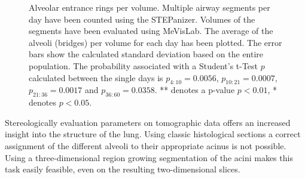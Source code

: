 \begin{figure}
	\centering
	\caption[Alveolar entrance rings per volume]{Alveolar entrance rings per volume. Multiple airway segments per day have been counted using the STEPanizer. Volumes of the segments have been evaluated using MeVisLab. The average of the alveoli (bridges) per volume for each day has been plotted. The error bars show the calculated standard deviation based on the entire population. The probability associated with a Student's t-Test $p$ calculated between the single days is $p_{4:10}=0.0056$, $p_{10:21}=0.0007$, $p_{21:36}=0.0017$ and $p_{36:60}=0.0358$. ** denotes a p-value $p<0.01$, * denotes $p<0.05$.}
	\label{fig:alveoli per volume plot}
\end{figure}

Stereologically evaluation parameters on tomographic data offers an increased insight into the structure of the lung. Using classic histological sections a correct assignment of the different alveoli to their appropriate acinus is not possible. Using a three-dimensional region growing segmentation of the acini makes this task easily feasible, even on the resulting two-dimensional slices.